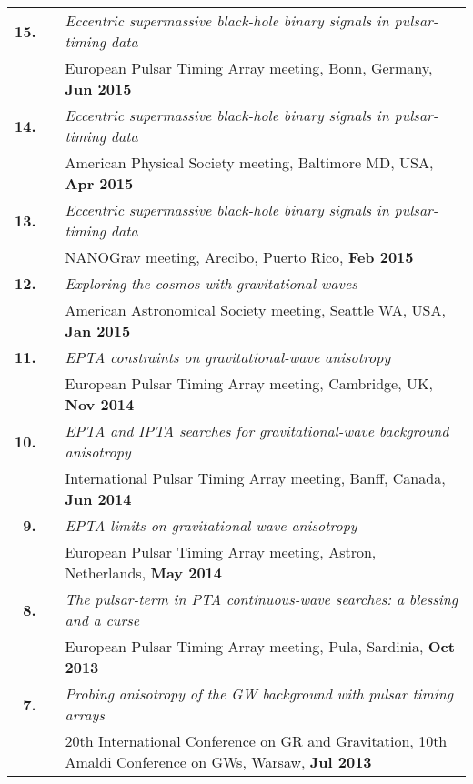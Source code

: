 \documentclass[11pt,letterpaper,sans]{moderncv}
\begin{document}
{\begin{longtable}{rp{0.3cm}p{15.8cm}}
\textbf{15.} & & \textit{Eccentric supermassive black-hole binary signals in pulsar-timing data} \\ 
&& European Pulsar Timing Array meeting, Bonn, Germany, \textbf{Jun 2015} \vspace{0.09cm}\\
\textbf{14.} & & \textit{Eccentric supermassive black-hole binary signals in pulsar-timing data} \\ 
&& American Physical Society meeting, Baltimore MD, USA, \textbf{Apr 2015} \vspace{0.09cm}\\
\textbf{13.} & & \textit{Eccentric supermassive black-hole binary signals in pulsar-timing data} \\ 
&& NANOGrav meeting, Arecibo, Puerto Rico, \textbf{Feb 2015} \vspace{0.09cm}\\
\textbf{12.} & & \textit{Exploring the cosmos with gravitational waves} \\ 
&& American Astronomical Society meeting, Seattle WA, USA, \textbf{Jan 2015} \vspace{0.09cm}\\
\textbf{11.} & & \textit{EPTA constraints on gravitational-wave anisotropy} \\ 
&& European Pulsar Timing Array meeting, Cambridge, UK, \textbf{Nov 2014} \vspace{0.09cm}\\
\textbf{10.} & & \textit{EPTA and IPTA searches for gravitational-wave background anisotropy} \\ 
&& International Pulsar Timing Array meeting, Banff, Canada, \textbf{Jun 2014} \vspace{0.09cm}\\
\textbf{9.} & & \textit{EPTA limits on gravitational-wave anisotropy} \\ 
&& European Pulsar Timing Array meeting, Astron, Netherlands, \textbf{May 2014} \vspace{0.09cm}\\
\textbf{8.} & & \textit{The pulsar-term in PTA continuous-wave searches: a blessing and a curse} \\ 
&& European Pulsar Timing Array meeting, Pula, Sardinia, \textbf{Oct 2013} \vspace{0.09cm}\\
\textbf{7.} & & \textit{Probing anisotropy of the GW background with pulsar timing arrays} \\ 
&& 20th International Conference on GR and Gravitation, 10th Amaldi Conference on GWs, Warsaw, \textbf{Jul 2013} \vspace{0.09cm}\\

\end{longtable}}
\end{document}

